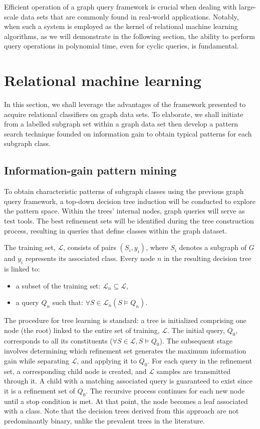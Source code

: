 \documentclass[mathematics,article,submit,pdftex,moreauthors]{Definitions/mdpi}
\begin{document}
Efficient operation of a graph query framework is crucial when dealing with large-scale data sets that are commonly found in real-world applications. Notably, when such a system is employed as the kernel of relational machine learning algorithms, as we will demonstrate in the following section, the ability to perform query operations in polynomial time, even for cyclic queries, is fundamental.

\section{Relational machine learning}
\label{rml}

In this section, we shall leverage the advantages of the framework presented to acquire relational classifiers on graph data sets. To elaborate, we shall initiate from a labelled subgraph set within a graph data set then develop a pattern search technique founded on information gain to obtain typical patterns for each subgraph class.

\subsection{Information-gain pattern mining}
\label{algorithm}

To obtain characteristic patterns of subgraph classes using the previous graph query framework, a top-down decision tree induction will be conducted to explore the pattern space. Within the trees' internal nodes, graph queries will serve as test tools. The best refinement sets will be identified during the tree construction process, resulting in queries that define classes within the graph dataset. 

The training set, $\mathcal{L}$, consists of pairs $(S_i, y_i)$, where $S_i$ denotes a subgraph of $G$ and $y_i$ represents its associated class. Every node $n$ in the resulting decision tree is linked to:
 
\begin{itemize}
\item a subset of the training set: $\mathcal{L}_n \subseteq \mathcal{L}$, 
\item a query $Q_n$ such that: $\forall S \in \mathcal {L}_n (S \vDash Q_n)$.
\end{itemize}

The procedure for tree learning is standard: a tree is initialized comprising one node (the root) linked to the entire set of training, $\mathcal{L}$. The initial query, $ Q_0 $, corresponds to all its constituents ($\forall S \in \mathcal{L}, S \vDash Q_0$). The subsequent stage involves determining which refinement set generates the maximum information gain while separating $\mathcal{L}$, and applying it to $ Q_0 $. For each query in the refinement set, a corresponding child node is created, and $\mathcal{L}$ samples are transmitted through it. A child with a matching associated query is guaranteed to exist since it is a refinement set of $Q_0$. The recursive process continues for each new node until a stop condition is met. At that point, the node becomes a leaf associated with a class. Note that the decision trees derived from this approach are not predominantly binary, unlike the prevalent trees in the literature. 
\end{document}
